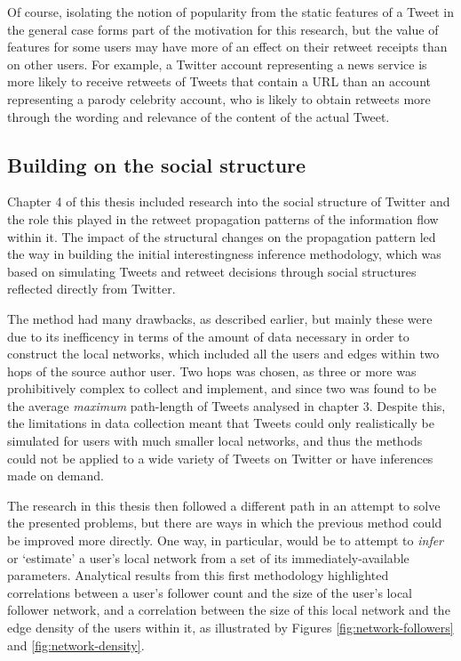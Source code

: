 Of course, isolating the notion of popularity from the static features of a Tweet in the general case forms part of the motivation for this research, but the value of features for some users may have more of an effect on their retweet receipts than on other users. For example, a Twitter account representing a news service is more likely to receive retweets of Tweets that contain a URL than an account representing a parody celebrity account, who is likely to obtain retweets more through the wording and relevance of the content of the actual Tweet.


\subsection{Building on the social structure}
Chapter 4 of this thesis included research into the social structure of Twitter and the role this played in the retweet propagation patterns of the information flow within it. The impact of the structural changes on the propagation pattern led the way in building the initial interestingness inference methodology, which was based on simulating Tweets and retweet decisions through social structures reflected directly from Twitter.

The method had many drawbacks, as described earlier, but mainly these were due to its inefficency in terms of the amount of data necessary in order to construct the local networks, which included all the users and edges within two hops of the source author user. Two hops was chosen, as three or more was prohibitively complex to collect and implement, and since two was found to be the average \textit{maximum} path-length of Tweets analysed in chapter 3. Despite this, the limitations in data collection meant that Tweets could only realistically be simulated for users with much smaller local networks, and thus the methods could not be applied to a wide variety of Tweets on Twitter or have inferences made on demand.

The research in this thesis then followed a different path in an attempt to solve the presented problems, but there are ways in which the previous method could be improved more directly. One way, in particular, would be to attempt to \textit{infer} or `estimate' a user's local network from a set of its immediately-available parameters. Analytical results from this first methodology highlighted correlations between a user's follower count and the size of the user's local follower network, and a correlation between the size of this local network and the edge density of the users within it, as illustrated by Figures \ref{fig:network-followers} and \ref{fig:network-density}.

